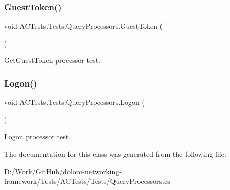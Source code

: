 \subsubsection{\texorpdfstring{Guest\+Token()}{GuestToken()}}
{\footnotesize\ttfamily void A\+C\+Tests.\+Tests.\+Query\+Processors.\+Guest\+Token (\begin{DoxyParamCaption}{ }\end{DoxyParamCaption})}



Get\+Guest\+Token processor test. 

\mbox{\label{class_a_c_tests_1_1_tests_1_1_query_processors_a52c322106f55712f33a2e1c1273008ad}} 
\subsubsection{\texorpdfstring{Logon()}{Logon()}}
{\footnotesize\ttfamily void A\+C\+Tests.\+Tests.\+Query\+Processors.\+Logon (\begin{DoxyParamCaption}{ }\end{DoxyParamCaption})}



Logon processor test. 



The documentation for this class was generated from the following file\+:\begin{DoxyCompactItemize}
\item 
D\+:/\+Work/\+Git\+Hub/doloro-\/networking-\/framework/\+Tests/\+A\+C\+Tests/\+Tests/Query\+Processors.\+cs\end{DoxyCompactItemize}
